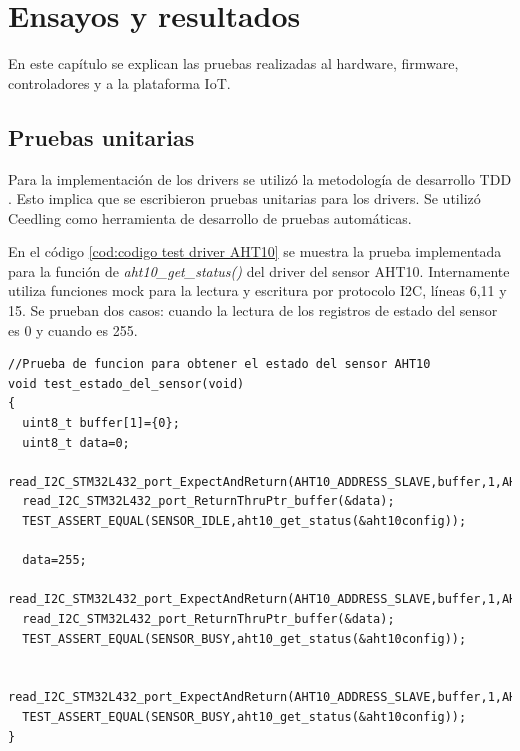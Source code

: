 
\chapter{Ensayos y resultados} %
En este capítulo se explican las pruebas realizadas al hardware, firmware, controladores y a la plataforma IoT.
\label{Chapter4} %


\section{Pruebas unitarias}
Para la implementación de los drivers se utilizó la metodología de desarrollo TDD \citep{METODOLOGIA_TDD}. Esto implica que se escribieron pruebas unitarias para los drivers. Se utilizó Ceedling como herramienta de desarrollo de pruebas automáticas.

En el código \ref{cod:codigo test driver AHT10} se muestra la prueba implementada para la función de \emph{aht10\_get\_status()} del driver del sensor AHT10. Internamente utiliza funciones mock para la lectura y escritura por protocolo I2C, líneas 6,11 y 15. 
Se prueban dos casos: cuando la lectura de los registros de estado del sensor es 0 y cuando es 255.
\begin{lstlisting}[label=cod:codigo test driver AHT10,caption=Tests del driver del sensor AHT10.]
//Prueba de funcion para obtener el estado del sensor AHT10
void test_estado_del_sensor(void)
{
  uint8_t buffer[1]={0};
  uint8_t data=0;
  read_I2C_STM32L432_port_ExpectAndReturn(AHT10_ADDRESS_SLAVE,buffer,1,AHT10_OK);
  read_I2C_STM32L432_port_ReturnThruPtr_buffer(&data);
  TEST_ASSERT_EQUAL(SENSOR_IDLE,aht10_get_status(&aht10config));
  
  data=255;
  read_I2C_STM32L432_port_ExpectAndReturn(AHT10_ADDRESS_SLAVE,buffer,1,AHT10_OK);
  read_I2C_STM32L432_port_ReturnThruPtr_buffer(&data);
  TEST_ASSERT_EQUAL(SENSOR_BUSY,aht10_get_status(&aht10config));
  
  read_I2C_STM32L432_port_ExpectAndReturn(AHT10_ADDRESS_SLAVE,buffer,1,AHT10_ERROR);
  TEST_ASSERT_EQUAL(SENSOR_BUSY,aht10_get_status(&aht10config)); 
}
\end{lstlisting}

